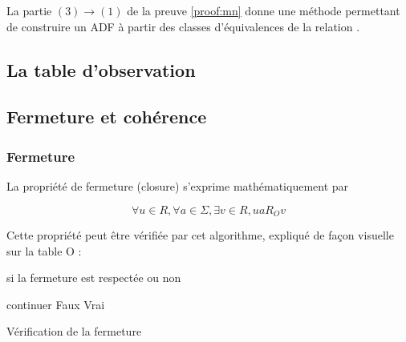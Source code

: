 	\begin{corollary}
		La partie $(3)\rightarrow(1)$ de la preuve \ref{proof:mn} donne une méthode permettant de construire un ADF à partir des classes d'équivalences de la relation \rl.
	\end{corollary}



  \subsection{La table d'observation}



\subsection{Fermeture et cohérence}

\subsubsection*{Fermeture}
La propriété de fermeture (closure) s'exprime mathématiquement par

$$ \forall u \in R, \forall a \in \Sigma, \exists v \in R, ua R_O v$$

Cette propriété peut être vérifiée par cet algorithme, expliqué de façon visuelle sur la table O :

\begin{algorithm}[H]
	\begin{algorithmic}[1]
		\ENSURE si la fermeture est respectée ou non

				\STATE continuer
			\ELSE
				\STATE {}
					\RETURN Faux
				\ENDIF
			\ENDIF
		\ENDFOR
		\ENDFOR
		\RETURN Vrai
	\end{algorithmic}
	\caption{Vérification de la fermeture}\label{alg:closure}
\end{algorithm}

